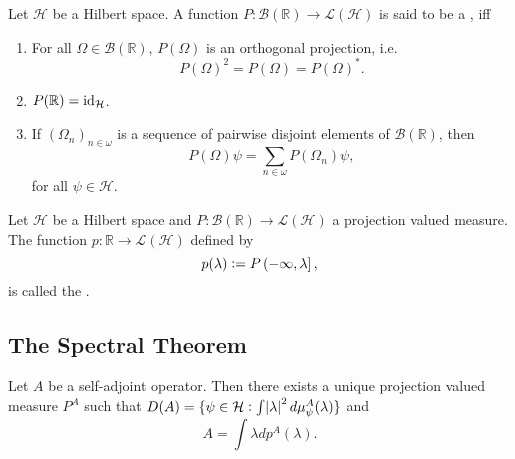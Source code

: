 \begin{definition}
	Let $\mathcal{H}$ be a Hilbert space. A function $P : \mathcal{B}(\mathbb{R}) \to \mathcal{L}(\mathcal{H})$ is said to be a , iff
	\begin{enumerate}[label = \textup{(}\roman*\textup{)},wide=0pt]
		\item For all $\Omega \in \mathcal{B}(\mathbb{R})$, $P(\Omega)$ is an orthogonal projection, i.e. 
			\begin{equation*}
				P(\Omega)^2 = P(\Omega) = P(\Omega)^*.
			\end{equation*}
		\item $P(\mathbb{R}) = \operatorname{id}_\mathcal{H}$.
		\item If $(\Omega_n)_{n \in \omega}$ is a sequence of pairwise disjoint elements of $\mathcal{B}(\mathbb{R})$, then
			\begin{equation*}
				P(\Omega)\psi = \sum_{n \in \omega} P(\Omega_n)\psi,
			\end{equation*}
			\noindent for all $\psi \in \mathcal{H}$.
	\end{enumerate}
\end{definition}

\begin{definition}
	Let $\mathcal{H}$ be a Hilbert space and $P : \mathcal{B}(\mathbb{R}) \to \mathcal{L}(\mathcal{H})$ a projection valued measure. The function $p : \mathbb{R} \to \mathcal{L}(\mathcal{H})$ defined by
	\begin{equation*}
		p(\lambda) := P\intoc{-\infty,\lambda},
	\end{equation*}
	\noindent is called the .
\end{definition}

\subsection*{The Spectral Theorem}

\begin{theorem}
	Let $A$ be a self-adjoint operator. Then there exists a unique projection valued measure $P^A$ such that $D(A) = \cbr[0]{\psi \in \mathcal{H} : \int \abs{\lambda}^2 d\mu_\psi^A(\lambda)}$ and
	\begin{equation*}
		A = \int \lambda dp^A(\lambda).
	\end{equation*}
\end{theorem}

